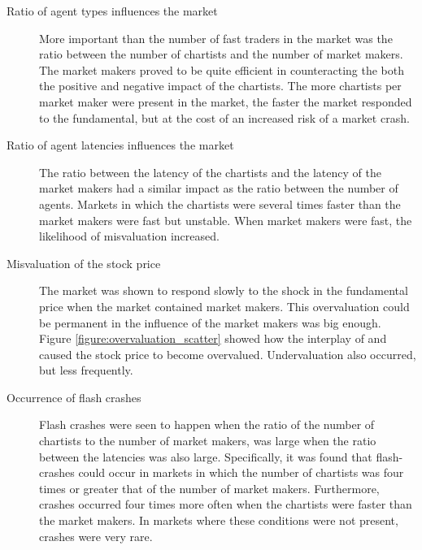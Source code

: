 \begin{description}
\item[Ratio of agent types influences the market] More important than the number of fast traders in the market was the ratio between the number of chartists and the number of market makers. The market makers proved to be quite efficient in counteracting the both the positive and negative impact of the chartists. The more chartists per market maker were present in the market, the faster the market responded to the fundamental, but at the cost of an increased risk of a market crash.
\item[Ratio of agent latencies influences the market] The ratio between the latency of the chartists and the latency of the market makers had a similar impact as the ratio between the number of agents. Markets in which the chartists were several times faster than the market makers were fast but unstable. When market makers were fast, the likelihood of misvaluation increased.

\item[Misvaluation of the stock price] The market was shown to respond slowly to the shock in the fundamental price when the market contained market makers. This overvaluation could be permanent in the influence of the market makers was big enough. Figure \ref{figure:overvaluation_scatter} showed how the interplay of \ssmmnAgents{} and \ssmmlatencymu{} caused the stock price to become overvalued. Undervaluation also occurred, but less frequently.
\item[Occurrence of flash crashes] Flash crashes were seen to happen when the ratio of the number of chartists to the number of market makers, \ratioagents{} was large when the ratio between the latencies \ratiolatency{} was also large. Specifically, it was found that flash-crashes could occur in markets in which  the number of chartists was four times or greater that of the number of market makers. Furthermore, crashes occurred four times more often when the chartists were faster than the market makers. In markets where these conditions were not present, crashes were very rare.
\end{description}






